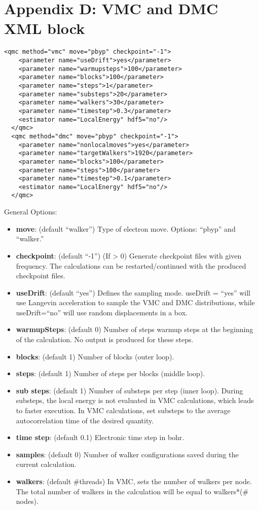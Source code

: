 \newpage
\section{Appendix D: VMC and DMC XML block}\label{sec:lab_adv_mol_vmcdmc_appendix}

\begin{lstlisting}[style=QMCPXML,caption=``Sample XML blocks for VMC and DMC calculations.",label=lst:lam_xml_vmc_dmc]
  <qmc method="vmc" move="pbyp" checkpoint="-1">
    <parameter name="useDrift">yes</parameter>
    <parameter name="warmupsteps">100</parameter>
    <parameter name="blocks">100</parameter>
    <parameter name="steps">1</parameter>
    <parameter name="substeps">20</parameter>
    <parameter name="walkers">30</parameter>
    <parameter name="timestep">0.3</parameter>
    <estimator name="LocalEnergy" hdf5="no"/>
  </qmc>
  <qmc method="dmc" move="pbyp" checkpoint="-1">
    <parameter name="nonlocalmoves">yes</parameter>
    <parameter name="targetWalkers">1920</parameter>
    <parameter name="blocks">100</parameter>
    <parameter name="steps">100</parameter>
    <parameter name="timestep">0.1</parameter>
    <estimator name="LocalEnergy" hdf5="no"/>
  </qmc>
\end{lstlisting}

General Options:
\begin{itemize}
\item{\textbf{move}: (default ``walker”) Type of electron move. Options: ``pbyp” and ``walker.”}
\item{\textbf{checkpoint}: (default ``-1”) (If > 0) Generate checkpoint files with given frequency.
The calculations can be restarted/continued with the produced checkpoint files.}
\item{\textbf{useDrift}: (default ``yes”) Defines the sampling mode. useDrift = ``yes” will
use Langevin acceleration to sample the VMC and DMC distributions, while
useDrift=``no” will use random displacements in a box.}
\item{\textbf{warmupSteps}: (default 0) Number of steps warmup steps at the beginning of the
calculation. No output is produced for these steps.}
\item{\textbf{blocks}: (default 1) Number of blocks (outer loop).}
\item{\textbf{steps}: (default 1) Number of steps per blocks (middle loop).}
\item{\textbf{sub steps}: (default 1) Number of substeps per step (inner loop). During substeps,
the local energy is not evaluated in VMC calculations, which leads to faster execution.
In VMC calculations, set substeps to the average autocorrelation time of the desired
quantity.}
\item{\textbf{time step}: (default 0.1) Electronic time step in bohr.}
\item{\textbf{samples}: (default 0) Number of walker configurations saved during the current 
calculation.}
\item{\textbf{walkers}: (default \#threads) In VMC, sets the number of walkers per node. The total
number of walkers in the calculation will be equal to walkers*(\# nodes).}
\end{itemize}

